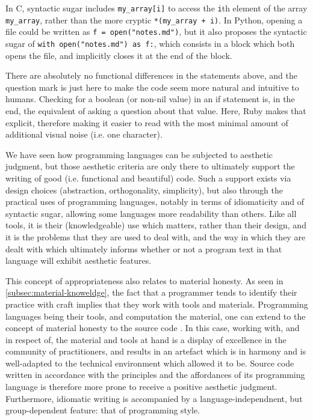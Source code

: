 \begin{listing}
  \inputminted{python}{./corpus/alive.rb}
  \caption{\emph{alive.rb} - Ruby features a lot of syntactic sugar. For instance, one can add the \lstinline{?} at the end of a method call in order to signify more clearly the boolean nature of the return value. Other languages tend to disallow the use of special characters in method names.}
  \label{code:ruby-alive}
\end{listing}

In C, syntactic sugar includes \lstinline{my_array[i]} to access the \lstinline{i}th element of the array \lstinline{my_array}, rather than the more cryptic \lstinline{*(my_array + i)}. In Python, opening a file could be written as \lstinline{f = open("notes.md")}, but it also proposes the syntactic sugar of \lstinline{with open("notes.md") as f:}, which consists in a block which both opens the file, and implicitly closes it at the end of the block.

There are absolutely no functional differences in the statements above, and the question mark is just here to make the code seem more natural and intuitive to humans. Checking for a boolean (or non-nil value) in an if statement is, in the end, the equivalent of asking a question about that value. Here, Ruby makes that explicit, therefore making it easier to read with the most minimal amount of additional visual noise (i.e. one character).

We have seen how programming languages can be subjected to aesthetic judgment, but those aesthetic criteria are only there to ultimately support the writing of good (i.e. functional and beautiful) code. Such a support exists via design choices (abstraction, orthogonality, simplicity), but also through the practical uses of programming languages, notably in terms of idiomaticity and of syntactic sugar, allowing some languages more readability than others. Like all tools, it is their (knowledgeable) use which matters, rather than their design, and it is the problems that they are used to deal with, and the way in which they are dealt with which ultimately informs whether or not a program text in that language will exhibit aesthetic features.

This concept of appropriateness also relates to material honesty. As seen in \autoref{subsec:material-knoweldge}, the fact that a programmer tends to identify their practice with craft implies that they work with tools and materials. Programming languages being their tools, and computation the material, one can extend to the concept of material honesty to the source code \citep{sennett_craftsman_2009}. In this case, working with, and in respect of, the material and tools at hand is a display of excellence in the community of practitioners, and results in an artefact which is in harmony and is well-adapted to the technical environment which allowed it to be. Source code written in accordance with the principles and the affordances of its programming language is therefore more prone to receive a positive aesthetic judgment. Furthermore, idiomatic writing is accompanied by a language-independnent, but group-dependent feature: that of programming style.


